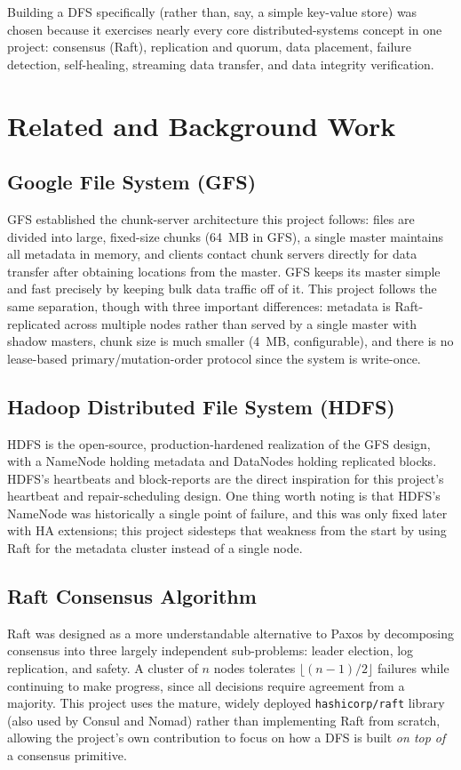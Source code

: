 \documentclass[12pt,a4paper]{report}
\begin{document}
Building a DFS specifically (rather than, say, a simple key-value store) was chosen because it exercises nearly every core distributed-systems concept in one project: consensus (Raft), replication and quorum, data placement, failure detection, self-healing, streaming data transfer, and data integrity verification.

\chapter{Related and Background Work}

\section{Google File System (GFS)}
GFS established the chunk-server architecture this project follows: files are divided into large, fixed-size chunks (64~MB in GFS), a single master maintains all metadata in memory, and clients contact chunk servers directly for data transfer after obtaining locations from the master. GFS keeps its master simple and fast precisely by keeping bulk data traffic off of it. This project follows the same separation, though with three important differences: metadata is Raft-replicated across multiple nodes rather than served by a single master with shadow masters, chunk size is much smaller (4~MB, configurable), and there is no lease-based primary/mutation-order protocol since the system is write-once.

\section{Hadoop Distributed File System (HDFS)}
HDFS is the open-source, production-hardened realization of the GFS design, with a NameNode holding metadata and DataNodes holding replicated blocks. HDFS's heartbeats and block-reports are the direct inspiration for this project's heartbeat and repair-scheduling design. One thing worth noting is that HDFS's NameNode was historically a single point of failure, and this was only fixed later with HA extensions; this project sidesteps that weakness from the start by using Raft for the metadata cluster instead of a single node.

\section{Raft Consensus Algorithm}
Raft was designed as a more understandable alternative to Paxos by decomposing consensus into three largely independent sub-problems: leader election, log replication, and safety. A cluster of $n$ nodes tolerates $\lfloor (n-1)/2 \rfloor$ failures while continuing to make progress, since all decisions require agreement from a majority. This project uses the mature, widely deployed \texttt{hashicorp/raft} library (also used by Consul and Nomad) rather than implementing Raft from scratch, allowing the project's own contribution to focus on how a DFS is built \emph{on top of} a consensus primitive.
\end{document}
